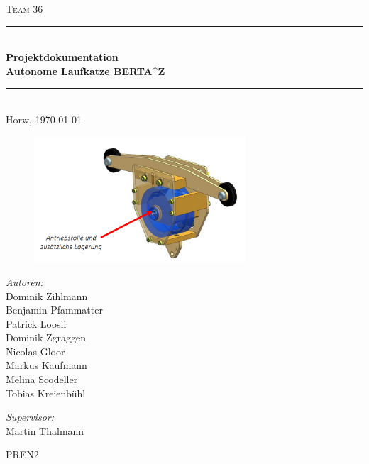 \begin{titlepage}   

\begin{center}
\textsc{\Large Team 36}\\[0.5cm]

\newcommand{\HRule}{\rule{\linewidth}{0.5mm}}
\HRule \\[0.4cm]
{ \huge \bfseries Projektdokumentation}\\[0.4cm]
{ \LARGE \bfseries Autonome Laufkatze BERTA^Z}\\[0.4cm]
\HRule \\[1.5cm]

{\large Horw, \today}

\begin{figure}[H]%
\centering
\includegraphics[width=0.7\textwidth]{Images/Titelbild.png}
\label{fig:title}
\end{figure}
\begin{minipage}{0.4\textwidth}
\begin{flushleft} \large
\emph{Autoren:}\\
Dominik Zihlmann\\
Benjamin Pfammatter\\
Patrick Loosli\\
Dominik Zgraggen\\
Nicolas Gloor\\
Markus Kaufmann\\
Melina Scodeller\\
Tobias Kreienbühl\\
\end{flushleft}
\end{minipage}
\hfill
\begin{minipage}{0.4\textwidth}
\begin{flushright} \large
\emph{Supervisor:} \\
Martin Thalmann
\end{flushright}
\end{minipage}
\large
\vfill
PREN2 \\

\end{center}

\end{titlepage}
